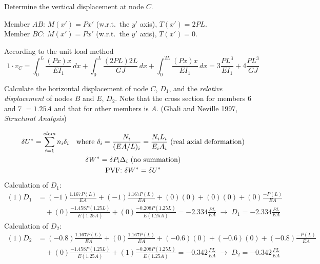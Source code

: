 \begin{example}[3D structure]
\leavevmode
\begin{fig}
  
\end{fig}
Determine the vertical displacement at node $C$.
\begin{solution}
\leavevmode
\begin{fig}
  
\end{fig}
Member $AB$: $M(x') = Px'$ (w.r.t.\ the $y'$ axis), $T(x') = 2PL$.\\
Member $BC$: $M(x') = Px'$ (w.r.t.\ the $y'$ axis), $T(x') = 0$.

According to the unit load method
\begin{equation*}
  1\cdot v_C = \int_0^L\frac{(Px)x}{EI_1}\,dx + \int_0^L\frac{(2PL)2L}{GJ}\,dx + \int_0^{2L}\frac{(Px)x}{EI_1}\,dx = 3\frac{PL^3}{EI_1} + 4\frac{PL^3}{GJ}
\end{equation*}
\end{solution}
\end{example}

\begin{example}
Calculate the horizontal displacement of node $C$, $D_1$, and the \emph{relative displacement} of nodes $B$ and $E$, $D_2$. Note that the cross section for members 6 and 7 $= 1.25A$ and that for other members is $A$. (Ghali and Neville 1997, \emph{Structural Analysis})
\begin{fig}
  
\end{fig}
\begin{gather*}
  \delta U^* = \sum_{i=1}^{elem}n_i\delta_i\quad\text{where } \delta_i = \frac{N_i}{(EA/L)_i} = \frac{N_iL_i}{E_iA_i}\ \text{(real axial deformation)}\\
  \delta W^* = \delta P_i\Delta_i\ \text{(no summation)}\\
  \text{PVF: } \delta W^* = \delta U^*
\end{gather*}
Calculation of $D_1$:
\begin{align*}
  (1)D_1 &= (-1)\frac{1.167P(L)}{EA} + (-1)\frac{1.167P(L)}{EA} + (0)(0) + (0)(0) + (0)\frac{-P(L)}{EA}\\
         &\quad + (0)\frac{-1.458P(1.25L)}{E(1.25A)} + (0)\frac{-0.208P(1.25L)}{E(1.25A)} = -2.334\frac{PL}{EA}
  \;\rightarrow\; D_1 = -2.334\frac{PL}{EA}
\end{align*}
Calculation of $D_2$:
\begin{align*}
  (1)D_2 &= (-0.8)\frac{1.167P(L)}{EA} + (0)\frac{1.167P(L)}{EA} + (-0.6)(0) + (-0.6)(0) + (-0.8)\frac{-P(L)}{EA}\\
         &\quad + (0)\frac{-1.458P(1.25L)}{E(1.25A)} + (1)\frac{-0.208P(1.25L)}{E(1.25A)} = -0.342\frac{PL}{EA}
  \;\rightarrow\; D_2 = -0.342\frac{PL}{EA}
\end{align*}
\end{example}

